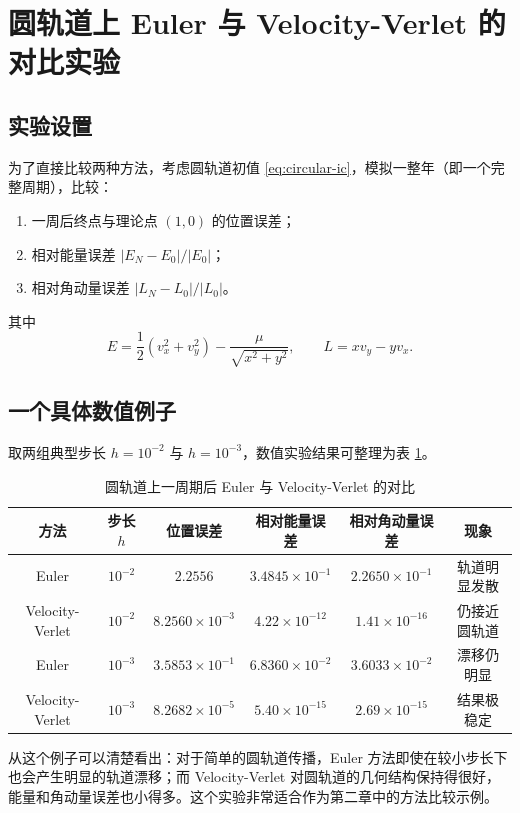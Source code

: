 \documentclass[12pt,a4paper]{ctexrep}
\begin{document}
\section{圆轨道上 Euler 与 Velocity-Verlet 的对比实验}

\subsection{实验设置}

为了直接比较两种方法，考虑圆轨道初值 \eqref{eq:circular-ic}，模拟一整年（即一个完整周期），比较：
\begin{enumerate}[label=\arabic*.]
  \item 一周后终点与理论点 \((1,0)\) 的位置误差；
  \item 相对能量误差 \( |E_N-E_0|/|E_0| \)；
  \item 相对角动量误差 \( |L_N-L_0|/|L_0| \)。
\end{enumerate}
其中
\[
E=\frac12(v_x^2+v_y^2)-\frac{\mu}{\sqrt{x^2+y^2}},
\qquad
L=xv_y-yv_x.
\]

\subsection{一个具体数值例子}

取两组典型步长 \(h=10^{-2}\) 与 \(h=10^{-3}\)，数值实验结果可整理为表 \ref{tab:euler-vv-circle}。

\begin{table}[H]
\centering
\caption{圆轨道上一周期后 Euler 与 Velocity-Verlet 的对比}
\label{tab:euler-vv-circle}
\begin{tabular}{cccccc}
\toprule
方法 & 步长 \(h\) & 位置误差 & 相对能量误差 & 相对角动量误差 & 现象 \\
\midrule
Euler & $10^{-2}$ & $2.2556$ & $3.4845\times 10^{-1}$ & $2.2650\times 10^{-1}$ & 轨道明显发散 \\
Velocity-Verlet & $10^{-2}$ & $8.2560\times 10^{-3}$ & $4.22\times 10^{-12}$ & $1.41\times 10^{-16}$ & 仍接近圆轨道 \\
Euler & $10^{-3}$ & $3.5853\times 10^{-1}$ & $6.8360\times 10^{-2}$ & $3.6033\times 10^{-2}$ & 漂移仍明显 \\
Velocity-Verlet & $10^{-3}$ & $8.2682\times 10^{-5}$ & $5.40\times 10^{-15}$ & $2.69\times 10^{-15}$ & 结果极稳定 \\
\bottomrule
\end{tabular}
\end{table}

从这个例子可以清楚看出：对于简单的圆轨道传播，Euler 方法即使在较小步长下也会产生明显的轨道漂移；而 Velocity-Verlet 对圆轨道的几何结构保持得很好，能量和角动量误差也小得多。这个实验非常适合作为第二章中的方法比较示例。
\end{document}
